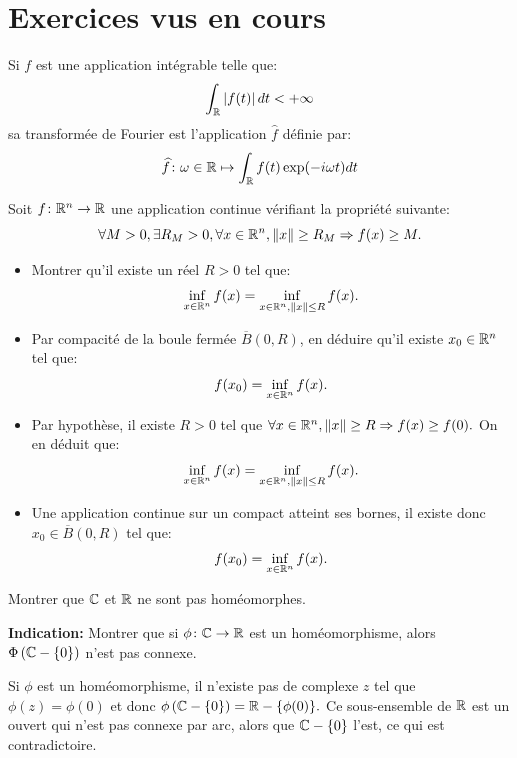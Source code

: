 \documentclass[a4paper, 12pt]{amsart}
\begin{document}
\section{Exercices vus en cours}
Si $f$ est une application intégrable telle que:
\[
\int_{\mathbb{R}} \left | f(t) \right| dt < +\infty
\]
sa transformée de Fourier est l'application $\widehat{f}$ définie par:
\[
\widehat{f} \colon \omega \in \mathbb{R} \mapsto \int_{\mathbb{R}} f(t) \exp(-i \omega t ) dt
\]
\begin{fex}
    Soit $f \colon \mathbb{R}^n \to \mathbb{R}$ une application continue vérifiant la propriété suivante:
    \[
    \forall M > 0, \exists R_M > 0, \forall x \in \mathbb{R}^n, \| x \| \geq R_M \Rightarrow f(x) \geq M. 
    \]
    \begin{itemize}
        \item Montrer qu'il existe un réel $R > 0$ tel que:
        \[\inf_{x\in \mathbb{R}^n} f(x) = \inf_{x\in \mathbb{R}^n, \|x\| \leq R} f(x).\]
        \item Par compacité de la boule fermée $\overline{B}(0,R)$, en déduire qu'il existe $x_0 \in \mathbb{R}^n$ tel que:
        \[
        f(x_0) = \inf_{x\in \mathbb{R}^n} f(x).
        \]
    \end{itemize}
\end{fex}
\begin{itemize}
    \item  Par hypothèse, il existe $R> 0$ tel que $\forall x \in \mathbb{R}^n, \| x \| \geq R \Rightarrow f(x) \geq f(0).$ On en déduit que:
    \begin{equation}
        \inf_{x\in \mathbb{R}^n} f(x) = \inf_{x\in \mathbb{R}^n, \|x\| \leq R} f(x).
    \end{equation}
    \item Une application continue sur un compact atteint ses bornes, il existe donc $x_0 \in \overline{B}(0,R)$ tel que:
    \begin{equation}
        f(x_0) = \inf_{x\in \mathbb{R}^n} f(x).
    \end{equation}
\end{itemize}


\begin{fex}
   Montrer que $\mathbb{C}$ et $\mathbb{R}$ ne sont pas homéomorphes. 
    
    \textbf{Indication:} Montrer que si $\phi \colon \mathbb{C} \to \mathbb{R}$ est un homéomorphisme, alors $\Phi\left(\mathbb{C}-\{0\}\right)$ n'est pas connexe.    
\end{fex}
Si $\phi$ est un homéomorphisme, il n'existe pas de complexe $z$ tel que $\phi(z)=\phi(0)$ et donc
$\phi\left(\mathbb{C} - \{0\}\right)=\mathbb{R}-\{\phi(0)\}.$ Ce sous-ensemble de $\mathbb{R}$ est un ouvert qui n'est pas
connexe par arc, alors que $\mathbb{C} - \{0\}$ l'est, ce qui est contradictoire.
\end{document}

